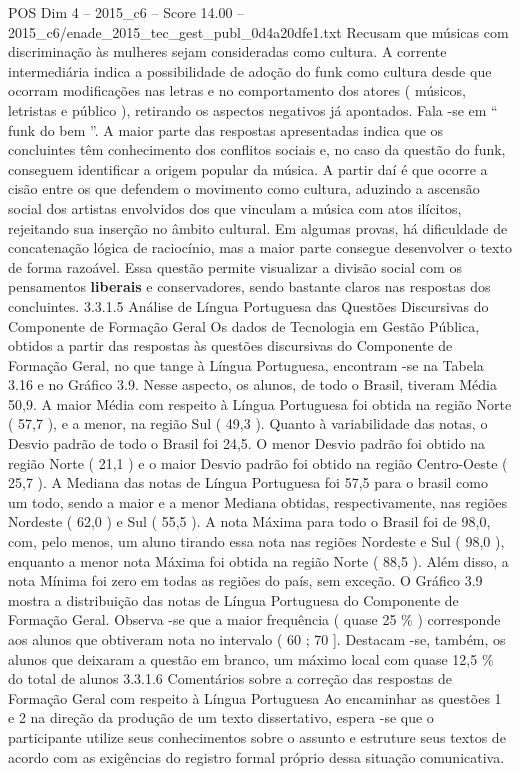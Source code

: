 \begin{textsample}{POS Dim 4 – 2015\_c6 – Score 14.00 – 2015\_c6/enade\_2015\_tec\_gest\_publ\_0d4a20dfe1.txt}
Recusam que músicas com discriminação às mulheres sejam consideradas como cultura.
A corrente intermediária indica a possibilidade de adoção do funk como cultura desde que ocorram modificações nas letras e no comportamento dos atores ( músicos, letristas e público ), retirando os aspectos negativos já apontados.
Fala -se em “ funk do bem ”.
A maior parte das respostas apresentadas indica que os concluintes têm conhecimento dos conflitos sociais e, no caso da questão do funk, conseguem identificar a origem popular da música.
A partir daí é que ocorre a cisão entre os que defendem o movimento como cultura, aduzindo a ascensão social dos artistas envolvidos dos que vinculam a música com atos ilícitos, rejeitando sua inserção no âmbito cultural.
Em algumas provas, há dificuldade de concatenação lógica de raciocínio, mas a maior parte consegue desenvolver o texto de forma razoável.
Essa questão permite visualizar a divisão social com os pensamentos \textbf{liberais} e conservadores, sendo bastante claros nas respostas dos concluintes. 3.3.1.5 Análise de Língua Portuguesa das Questões Discursivas do Componente de Formação Geral Os dados de Tecnologia em Gestão Pública, obtidos a partir das respostas às questões discursivas do Componente de Formação Geral, no que tange à Língua Portuguesa, encontram -se na Tabela 3.16 e no Gráfico 3.9.
Nesse aspecto, os alunos, de todo o Brasil, tiveram Média 50,9.
A maior Média com respeito à Língua Portuguesa foi obtida na região Norte ( 57,7 ), e a menor, na região Sul ( 49,3 ).
Quanto à variabilidade das notas, o Desvio padrão de todo o Brasil foi 24,5.
O menor Desvio padrão foi obtido na região Norte ( 21,1 ) e o maior Desvio padrão foi obtido na região Centro-Oeste ( 25,7 ).
A Mediana das notas de Língua Portuguesa foi 57,5 para o brasil como um todo, sendo a maior e a menor Mediana obtidas, respectivamente, nas regiões Nordeste ( 62,0 ) e Sul ( 55,5 ).
A nota Máxima para todo o Brasil foi de 98,0, com, pelo menos, um aluno tirando essa nota nas regiões Nordeste e Sul ( 98,0 ), enquanto a menor nota Máxima foi obtida na região Norte ( 88,5 ).
Além disso, a nota Mínima foi zero em todas as regiões do país, sem exceção.
O Gráfico 3.9 mostra a distribuição das notas de Língua Portuguesa do Componente de Formação Geral.
Observa -se que a maior frequência ( quase 25 \% ) corresponde aos alunos que obtiveram nota no intervalo ( 60 ; 70 ].
Destacam -se, também, os alunos que deixaram a questão em branco, um máximo local com quase 12,5 \% do total de alunos 3.3.1.6 Comentários sobre a correção das respostas de Formação Geral com respeito à Língua Portuguesa Ao encaminhar as questões 1 e 2 na direção da produção de um texto dissertativo, espera -se que o participante utilize seus conhecimentos sobre o assunto e estruture seus textos de acordo com as exigências do registro formal próprio dessa situação comunicativa.

\end{textsample}
